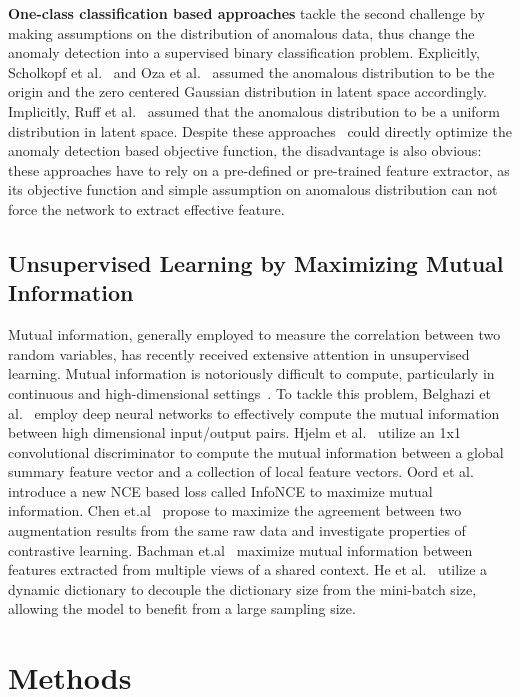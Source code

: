 \documentclass[journal]{IEEEtran}
\theoremstyle{remark}
\begin{document}
\textbf{One-class classification based approaches} tackle the second challenge by making assumptions on the distribution of anomalous data, thus change the anomaly detection into a supervised binary classification problem. Explicitly, Scholkopf et al.~\cite{OC-SVM} and Oza et al.~\cite{oza2018one} assumed the anomalous distribution to be the origin and the zero centered Gaussian distribution in latent space accordingly. Implicitly, Ruff et al.~\cite{SVDD} assumed that the anomalous distribution to be a uniform distribution in latent space. Despite these approaches~\cite{OC-SVM,SVDD,oza2018one,SAD} could directly optimize the anomaly detection based objective function, the disadvantage is also obvious: these approaches have to rely on a pre-defined or pre-trained feature extractor, as its objective function and simple assumption on anomalous distribution can not force the network to extract effective feature.


\subsection{Unsupervised Learning by Maximizing Mutual Information}
Mutual information, generally employed to measure the correlation between two random variables, has recently received extensive attention in unsupervised learning. 
Mutual information is notoriously difficult to compute, particularly in continuous and high-dimensional settings~\cite{DIM}. To tackle this problem, Belghazi et al.~\cite{MINE} employ deep neural networks to effectively compute the mutual information between high dimensional input/output pairs. Hjelm et al.~\cite{DIM} utilize an 1x1 convolutional discriminator to compute the mutual information between a global summary feature vector and a collection of local feature vectors. 
Oord et al.~\cite{CPC} introduce a new NCE based loss called InfoNCE to maximize mutual information. Chen et.al~\cite{SimCLR} propose to maximize the agreement between two augmentation results from the same raw data and investigate properties of contrastive learning. Bachman et.al~\cite{AMDIM} maximize mutual information between features extracted from multiple views of a shared context. He et al.~\cite{MoCo1} utilize a dynamic dictionary to decouple the dictionary size from the mini-batch size, allowing the model to benefit from a large sampling size.

\section{Methods}
\end{document}

